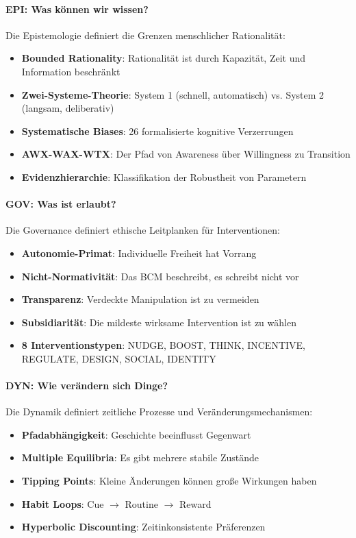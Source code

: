 \paragraph{EPI: Was können wir wissen?}
Die Epistemologie definiert die Grenzen menschlicher Rationalität:
\begin{itemize}
    \item \textbf{Bounded Rationality}: Rationalität ist durch Kapazität, Zeit und Information beschränkt
    \item \textbf{Zwei-Systeme-Theorie}: System 1 (schnell, automatisch) vs. System 2 (langsam, deliberativ)
    \item \textbf{Systematische Biases}: 26 formalisierte kognitive Verzerrungen
    \item \textbf{AWX-WAX-WTX}: Der Pfad von Awareness über Willingness zu Transition
    \item \textbf{Evidenzhierarchie}: Klassifikation der Robustheit von Parametern
\end{itemize}

\paragraph{GOV: Was ist erlaubt?}
Die Governance definiert ethische Leitplanken für Interventionen:
\begin{itemize}
    \item \textbf{Autonomie-Primat}: Individuelle Freiheit hat Vorrang
    \item \textbf{Nicht-Normativität}: Das BCM beschreibt, es schreibt nicht vor
    \item \textbf{Transparenz}: Verdeckte Manipulation ist zu vermeiden
    \item \textbf{Subsidiarität}: Die mildeste wirksame Intervention ist zu wählen
    \item \textbf{8 Interventionstypen}: NUDGE, BOOST, THINK, INCENTIVE, REGULATE, DESIGN, SOCIAL, IDENTITY
\end{itemize}

\paragraph{DYN: Wie verändern sich Dinge?}
Die Dynamik definiert zeitliche Prozesse und Veränderungsmechanismen:
\begin{itemize}
    \item \textbf{Pfadabhängigkeit}: Geschichte beeinflusst Gegenwart
    \item \textbf{Multiple Equilibria}: Es gibt mehrere stabile Zustände
    \item \textbf{Tipping Points}: Kleine Änderungen können große Wirkungen haben
    \item \textbf{Habit Loops}: Cue $\rightarrow$ Routine $\rightarrow$ Reward
    \item \textbf{Hyperbolic Discounting}: Zeitinkonsistente Präferenzen
\end{itemize}

